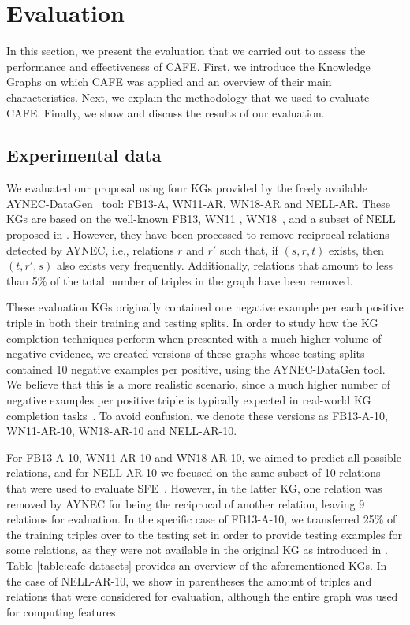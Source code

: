\section{Evaluation}\label{sec:cafe-evaluation}
In this section, we present the evaluation that we carried out to assess the performance and effectiveness of CAFE. First, we introduce the Knowledge Graphs on which CAFE was applied and an overview of their main characteristics. Next, we explain the methodology that we used to evaluate CAFE. Finally, we show and discuss the results of our evaluation.

\subsection{Experimental data}
We evaluated our proposal using four KGs provided by the freely available AYNEC-DataGen~\cite{ayala2019} tool: FB13-A, WN11-AR, WN18-AR and NELL-AR. These KGs are based on the well-known FB13, WN11 \cite{socher2013}, WN18~\cite{bordes2014}, and a subset of NELL proposed in \cite{gardner2015}. However, they have been processed to remove reciprocal relations detected by AYNEC, i.e., relations $r$ and $r'$ such that, if $(s, r, t)$ exists, then $(t, r', s)$ also exists very frequently. Additionally, relations that amount to less than 5\% of the total number of triples in the graph have been removed.

These evaluation KGs originally contained one negative example per each positive triple in both their training and testing splits. In order to study how the KG completion techniques perform when presented with a much higher volume of negative evidence, we created versions of these graphs whose testing splits contained 10 negative examples per positive, using the AYNEC-DataGen tool. We believe that this is a more realistic scenario, since a much higher number of negative examples per positive triple is typically expected in real-world KG completion tasks~\cite{borrego2019}. To avoid confusion, we denote these versions as FB13-A-10, WN11-AR-10, WN18-AR-10 and NELL-AR-10.

For FB13-A-10, WN11-AR-10 and WN18-AR-10, we aimed to predict all possible relations, and for NELL-AR-10 we focused on the same subset of 10 relations that were used to evaluate SFE~\cite{gardner2015}. However, in the latter KG, one relation was removed by AYNEC for being the reciprocal of another relation, leaving 9 relations for evaluation. In the specific case of FB13-A-10, we transferred 25\% of the training triples over to the testing set in order to provide testing examples for some relations, as they were not available in the original KG as introduced in \cite{socher2013}. Table \ref{table:cafe-datasets} provides an overview of the aforementioned KGs. In the case of NELL-AR-10, we show in parentheses the amount of triples and relations that were considered for evaluation, although the entire graph was used for computing features.

